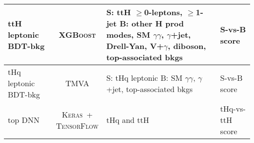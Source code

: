 \begin{tabular}{l|c|m{6cm}<{\centering}|m{4.5cm}<{\centering}}
    ttH leptonic BDT-bkg &  \textsc{XGBoost} & \makecell*[{{m{6cm}}}]{\centering S: ttH $\geq$0-leptons, $\geq$1-jet \\ B: other H prod modes, SM $\gamma\gamma$, $\gamma$+jet, Drell-Yan, V+$\gamma$, diboson, top-associated bkgs} & S-vs-B score \\ \hline
    
    tHq leptonic BDT-bkg &  \textsc{TMVA} & \makecell*[{{m{6cm}}}]{\centering S: tHq leptonic \\ B: SM $\gamma\gamma$, $\gamma$+jet, top-associated bkgs} & S-vs-B score \\ \hline
    
    top DNN &  \makecell{\textsc{Keras}~+\\\textsc{TensorFlow}} & tHq and ttH & tHq-vs-ttH score \\
\end{tabular}